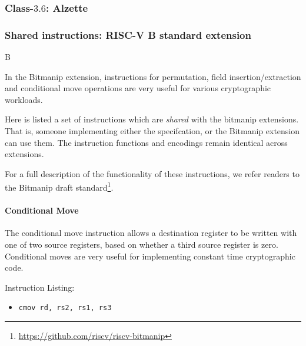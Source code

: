 

\subsubsection{Class-$3.6$: Alzette}
\label{sec:spec:instruction:3:6}




\subsubsection{Shared instructions: RISC-V B standard extension}
\label{sec:spec:instruction:B}


B~\cite[Chapter 17]{SCARV:RV:ISA:II}

In the Bitmanip extension, instructions for permutation, field
insertion/extraction and conditional move operations are very
useful for various cryptographic workloads.

Here is listed a set of instructions which are {\em shared} with
the bitmanip extensions.
That is, someone implementing either the \XCRYPTO specifcation, or
the Bitmanip extension can use them.
The instruction functions and encodings remain identical across extensions.

For a full description of the functionality of these instructions, we
refer readers to the Bitmanip draft standard\footnote{
\url{https://github.com/riscv/riscv-bitmanip}
}.

\paragraph{Conditional Move}
The conditional move instruction allows a destination register to
be written with one of two source registers, based on whether a
third source register is zero.
Conditional moves are very useful for implementing constant time
cryptographic code.

Instruction Listing:
\begin{itemize}
\item {\tt cmov rd, rs2, rs1, rs3}
\end{itemize}

